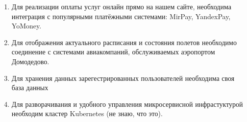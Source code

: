 
\begin{enumerate}
      \item Для реализации оплаты услуг онлайн прямо
            на нашем сайте, необходима интеграция с 
            популярными платёжными системами: 
            MirPay, YandexPay, YoMoney.
            
      \item Для отображения актуального
            расписания и состояния полетов необходимо 
            соединение с системами авиакомпаний, 
            обслуживаемых аэропортом Домодедово.
            
      \item Для хранения данных зарегестрированных 
            пользователей необходима своя база данных

      \item Для разворачивания и удобного управления 
            микросервисной инфрастуктурой необходим 
            кластер Kubernetes (не знаю, что это).
\end{enumerate}
